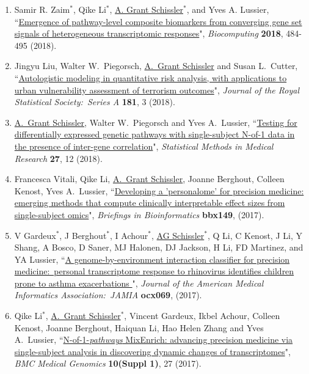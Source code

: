 \documentclass[paper=a4,fontsize=11pt]{scrartcl} %
\newcommand{\PaperEntry}[7]{
		\noindent #1, ``\href{#7}{#2}", \textit{#3} \textbf{#4}, #5 (#6).}
\begin{document}
\begin{enumerate}
\item \PaperEntry{Samir R. Zaim$^{*}$, Qike Li$^{*}$, \underline{A. Grant Schissler}$^{*}$, and Yves A. Lussier}{Emergence of pathway-level composite biomarkers from converging gene set signals of heterogeneous transcriptomic responses}{Biocomputing}{2018}{484-495}{2018}{https://www.worldscientific.com/doi/abs/10.1142/9789813235533_0044}
  
\item \PaperEntry{Jingyu Liu, Walter W.~Piegorsch, \underline{A.~Grant Schissler} and Susan L.~Cutter}{Autologistic modeling in quantitative risk analysis, with applications to urban vulnerability assessment of terrorism outcomes}{Journal of the Royal Statistical Society:~Series A}{181}{3}{2018}{http://dx.doi.org/10.1111/rssa.12323}
  
  \item \PaperEntry{\underline{A.~Grant Schissler}, Walter W.~Piegorsch and Yves A.~Lussier}{Testing for differentially expressed genetic pathways with single-subject N-of-1 data in the presence of inter-gene correlation}{Statistical Methods in Medical Research}{27}{12}{2018}{http://journals.sagepub.com/doi/10.1177/0962280217712271}

\item \PaperEntry{Francesca Vitali, Qike Li, \underline{A.~Grant Schissler}, Joanne Berghout, Colleen Kenost, Yves A.~Lussier}{Developing a 'personalome' for precision medicine: emerging methods that compute clinically interpretable effect sizes from single-subject omics}{Briefings in Bioinformatics}{bbx149}{}{2017}{https://academic.oup.com/bib/advance-article/doi/10.1093/bib/bbx149/4758622}

  \item \PaperEntry{V Gardeux$^{*}$, J Berghout$^{*}$, I Achour$^{*}$, \underline{AG Schissler}$^{*}$, Q Li, C Kenost, J Li, Y Shang, A Bosco, D Saner, MJ Halonen, DJ Jackson, H Li, FD Martinez, and YA Lussier}{A genome-by-environment interaction classifier for precision medicine:~personal transcriptome response to rhinovirus identifies children prone to asthma exacerbations
}{Journal of the American Medical Informatics Association:~JAMIA}{ocx069}{}{2017}{https://academic.oup.com/jamia/article-abstract/doi/10.1093/jamia/ocx069/4004728/A-genome-by-environment-interaction-classifier-for?redirectedFrom=fulltext}

\item \PaperEntry{Qike Li$^{*}$, \underline{A.~Grant Schissler$^{*}$}, Vincent Gardeux, Ikbel Achour, Colleen Kenost, Joanne Berghout, Haiquan Li, Hao Helen Zhang and Yves A.~Lussier}{N-of-1-\emph{pathways} MixEnrich: advancing precision medicine via single-subject analysis in discovering dynamic changes of transcriptomes}{BMC Medical Genomics}{10(Suppl 1)}{27}{2017}{https://bmcmedgenomics.biomedcentral.com/articles/10.1186/s12920-017-0263-4}


\end{enumerate}
\end{document}
